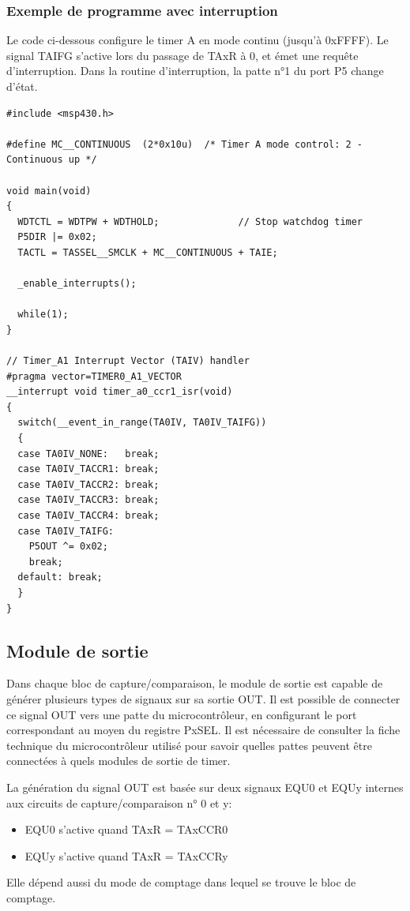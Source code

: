 \begin{minipage}{16cm}{
\subsubsection*{Exemple de programme avec interruption}
Le code ci-dessous configure le timer A en mode continu (jusqu'à 0xFFFF). Le signal TAIFG s'active lors du passage de TAxR à 0, et émet une requête d'interruption. Dans la routine d'interruption, la patte n°1 du port P5 change d'état.

\lstset{style=customc}
\begin{lstlisting}
#include <msp430.h>

#define MC__CONTINUOUS  (2*0x10u)  /* Timer A mode control: 2 - Continuous up */

void main(void)
{
  WDTCTL = WDTPW + WDTHOLD;              // Stop watchdog timer
  P5DIR |= 0x02;
  TACTL = TASSEL__SMCLK + MC__CONTINUOUS + TAIE;
  
  _enable_interrupts();
  
  while(1);
}

// Timer_A1 Interrupt Vector (TAIV) handler
#pragma vector=TIMER0_A1_VECTOR
__interrupt void timer_a0_ccr1_isr(void)
{
  switch(__event_in_range(TA0IV, TA0IV_TAIFG))
  {
  case TA0IV_NONE:   break;
  case TA0IV_TACCR1: break;
  case TA0IV_TACCR2: break;
  case TA0IV_TACCR3: break;
  case TA0IV_TACCR4: break;
  case TA0IV_TAIFG:
    P5OUT ^= 0x02;
    break;
  default: break;
  }
}
\end{lstlisting}
}
\end{minipage}

\subsection{Module de sortie}
\label{Module de sortie}
Dans chaque bloc de capture/comparaison, le module de sortie est capable de générer plusieurs types de signaux sur sa sortie OUT. Il est possible de connecter ce signal OUT vers une patte du microcontrôleur, en configurant le port correspondant au moyen du registre PxSEL.
Il est nécessaire de consulter la fiche technique du microcontrôleur utilisé pour savoir quelles pattes peuvent être connectées à quels modules de sortie de timer.

La génération du signal OUT est basée sur deux signaux EQU0 et EQUy internes aux circuits de capture/comparaison n° 0 et y:
\begin{itemize}[label=\textbullet,font=\small]
\item EQU0 s'active quand TAxR = TAxCCR0
\item EQUy s'active quand TAxR = TAxCCRy
\end{itemize}
Elle dépend aussi du mode de comptage dans lequel se trouve le bloc de comptage.

